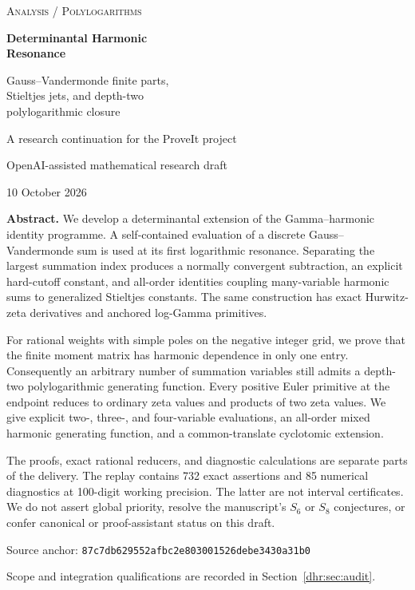 \documentclass[11pt,letterpaper]{article}
\numberwithin{equation}{section}
\theoremstyle{definition}\newtheorem{definition}[theorem]{Definition}
\theoremstyle{remark}\newtheorem{remark}[theorem]{Remark}
\begin{document}
\begin{titlepage}
\centering
\vspace*{1.1cm}
{\small\scshape Analysis / Polylogarithms\par}
\vspace{1cm}
{\huge\bfseries\color{ink} Determinantal Harmonic\\[0.2em] Resonance\par}
\vspace{0.7cm}
{\Large Gauss--Vandermonde finite parts,\\[0.25em] Stieltjes jets, and depth-two\\[0.25em] polylogarithmic closure\par}
\vspace{1cm}
{\large A research continuation for the ProveIt project\par}
\vspace{0.25cm}
{OpenAI-assisted mathematical research draft\par}
{10 October 2026\par}
\vspace{1cm}
\begin{minipage}{0.91\textwidth}
\small
\textbf{Abstract.}
We develop a determinantal extension of the Gamma--harmonic identity
programme. A self-contained evaluation of a discrete Gauss--Vandermonde
sum is used at its first logarithmic resonance. Separating the largest
summation index produces a normally convergent subtraction, an explicit
hard-cutoff constant, and all-order identities coupling many-variable
harmonic sums to generalized Stieltjes constants. The same construction
has exact Hurwitz-zeta derivatives and anchored log-Gamma primitives.

For rational weights with simple poles on the negative integer grid,
we prove that the finite moment matrix has harmonic dependence in only
one entry. Consequently an arbitrary number of summation variables still
admits a depth-two polylogarithmic generating function. Every positive
Euler primitive at the endpoint reduces to ordinary zeta values and
products of two zeta values. We give explicit two-, three-, and four-variable
evaluations, an all-order mixed harmonic generating function, and a
common-translate cyclotomic extension.

The proofs, exact rational reducers, and diagnostic calculations are
separate parts of the delivery. The replay contains 732 exact assertions
and 85 numerical diagnostics at 100-digit working precision. The latter
are not interval certificates. We do not assert global priority, resolve
the manuscript's $S_6$ or $S_8$ conjectures, or confer canonical or
proof-assistant status on this draft.
\end{minipage}
\vfill
{\small Source anchor: \texttt{87c7db629552afbc2e803001526debe3430a31b0}\par}
{\small Scope and integration qualifications are recorded in Section~\ref{dhr:sec:audit}.\par}
\end{titlepage}
\begingroup
\small
\setlength{\parskip}{0pt}
\tableofcontents
\endgroup
\clearpage
\end{document}
